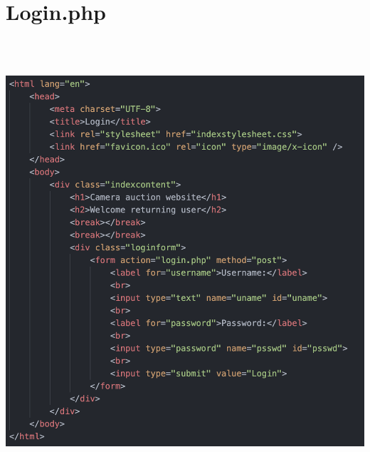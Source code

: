 \section*{Login.php}

\includegraphics[width=6.26806in,height=6.47569in]{ch6_appendix/media/image7.png}


